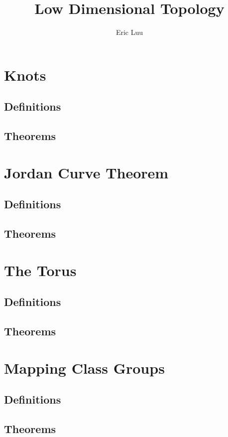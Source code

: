\documentclass{article}
\title{Low Dimensional Topology}
\author{Eric Luu}
\theoremstyle{definition}
\numberwithin{theorem}{section}
\numberwithin{equation}{section}
\begin{document}
\section{Knots}

\subsection{Definitions}


\subsection{Theorems}

\section{Jordan Curve Theorem}

\subsection{Definitions}


\subsection{Theorems}

\section{The Torus}

\subsection{Definitions}


\subsection{Theorems}

\section{Mapping Class Groups}

\subsection{Definitions}


\subsection{Theorems}
\end{document}

